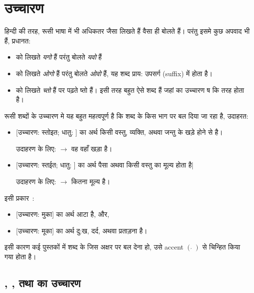 \section{उच्चारण}\label{sec:alpha-pronounce}
  हिन्दी की तरह, रूसी भाषा में भी अधिकतर जैसा लिखते हैं वैसा ही बोलते हैं। परंतु इसमे कुछ अपवाद भी हैं, प्रधानत:
  \begin{itemize}
    \item {} को लिखते \textit{यगो} हैं परंतु बोलते \textit{यवो} हैं
    \item {} को लिखते \textit{ओगो} हैं परंतु बोलते \textit{ओवो} हैं, यह शब्द प्राय: उपसर्ग (suffix) में होता है।
    \item {} को लिखते \textit{च्तो} हैं पर पढ़ते ष्तो हैं। इसी तरह बहुत ऐसे शब्द हैं जहां  का उच्चारण ष कि तरह होता है।
  \end{itemize}

  रूसी शब्दों के उच्चारण मे यह बहुत महत्वपूर्ण है कि शब्द के किस भाग पर बल दिया जा रहा है, उदाहरत:
  \begin{itemize}
    \item {} [उच्चारण: स्तोइत; धातु: ] का अर्थ किसी वस्तु, व्यक्ति, अथवा जन्तु के खड़े होने से
    है। \par उदाहरण के लिए:  $\rightarrow$ वह वहाँ खड़ा है।
    \item {} [उच्चारण: स्तईत; धातु: ] का अर्थ पैसा अथवा किसी वस्तु का मूल्य होता है| \par उदाहरण के लिए:  $\rightarrow$ कितना मूल्य है।
  \end{itemize}

  इसी प्रकार~\cite{levine_2009}:
  \begin{itemize}
    \item {} [उच्चारण: मुका] का अर्थ आटा है, और,
    \item {} [उच्चारण: मूका] का अर्थ दु:ख, दर्द, अथवा प्रताड़ना है।
  \end{itemize}

  इसी कारण कई पुस्तकों में शब्द के जिस अक्षर पर बल देना हो, उसे accent {\color{blue} {\large $\left( \acute{\,}\, \right)$}} से चिन्हित किया गया होता है। %

  \subsection{, , तथा  का उच्चारण}\label{subsec:alpha-pronounce-special-char}


